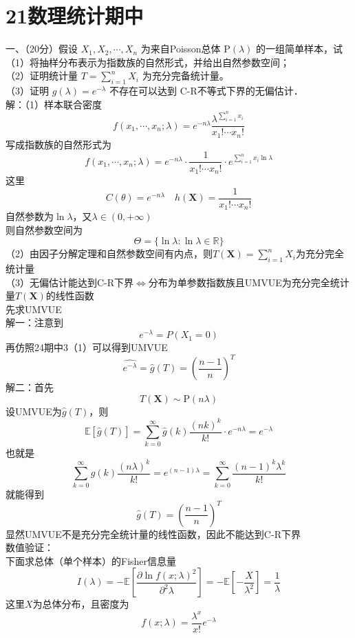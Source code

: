 \documentclass[UTF8,openany]{book}
\begin{document}
	\section{\centering 21数理统计期中}
	\noindent 一、（20分）假设 $X_1, X_2, \cdots, X_n$ 为来自Poisson总体 $\mathrm{P}(\lambda)$ 的一组简单样本，试\\
	（1）将抽样分布表示为指数族的自然形式，并给出自然参数空间；\\
	（2）证明统计量 $T=\sum_{i=1}^n X_i$ 为充分完备统计量。\\
	（3）证明 $g(\lambda)=e^{-\lambda}$ 不存在可以达到 C-R不等式下界的无偏估计．\\
	解：（1）样本联合密度
	\[
	f\left(x_1, \cdots, x_n ; \lambda\right)=e^{-n \lambda} \frac{\lambda^{\sum\limits_{i=1}^n x_i}}{x_{1}!\cdots x_{n}!}
	\]
	写成指数族的自然形式为
	\[
	f\left(x_1, \cdots, x_n ; \lambda\right)=e^{-n \lambda} \cdot \frac{1}{x_{1}!\cdots x_{n}!} \cdot e^{\sum\limits_{i=1}^{n} x_i \ln \lambda}
	\]
	这里
	\[
	C(\theta)=e^{-n \lambda}\quad h(\boldsymbol{X})=\frac{1}{x_{1}!\cdots x_{n}!}
	\]
	自然参数为$\ln \lambda$，又$\lambda \in (0,+\infty)$\\
	则自然参数空间为
	\[
	\Theta=\{\ln \lambda:\ln \lambda \in \mathbb{R}\}
	\]
	（2）由因子分解定理和自然参数空间有内点，则$T(\boldsymbol{X})=\sum\limits_{i=1}^n X_i$为充分完全统计量\\
	（3）无偏估计能达到C-R下界$\iff$分布为单参数指数族且UMVUE为充分完全统计量$T(\boldsymbol{X})$的线性函数\\
	先求UMVUE\\
	解一：注意到
	\[
	e^{-\lambda}=P(X_1=0)
	\]
	再仿照24期中3（1）可以得到UMVUE
	\[
	\hat{e^{-\lambda}}=\hat{g}(T)=\left(\frac{n-1}{n} \right)^T 
	\]
	解二：首先
	\[
	T(\boldsymbol{X})\sim \mathrm{P}(n\lambda)
	\]
	设UMVUE为$\hat{g}(T)$，则
	\[
	\mathbb{E}\left[\hat{g}(T) \right] =\sum_{k=0}^{\infty} \hat{g}(k)\frac{(nk)^k}{k!}\cdot e^{-n\lambda}=e^{-\lambda}
	\]
	也就是
	\[
	\sum_{k=0}^{\infty} \hat{g}(k) \frac{(n\lambda)^k}{k!}=e^{(n-1) \lambda}=\sum_{k=0}^{\infty} \frac{(n-1)^k \lambda^k}{k!}
	\]
	就能得到
	\[
	\hat{g}(T)=\left(\frac{n-1}{n} \right)^T 
	\]
	显然UMVUE不是充分完全统计量的线性函数，因此不能达到C-R下界\\
	数值验证：\\
	下面求总体（单个样本）的Fisher信息量
	\[
	I(\lambda)=-\mathbb{E}\left[\frac{\partial \ln f(x ; \lambda)^2}{\partial^2 \lambda}\right]=-\mathbb{E}\left[-\frac{X}{\lambda^2} \right] =\frac{1}{\lambda}
	\]
	这里$X$为总体分布，且密度为
	\[
	f(x ; \lambda)=\frac{\lambda^x}{x!}e^{-\lambda}
	\]
\end{document}
